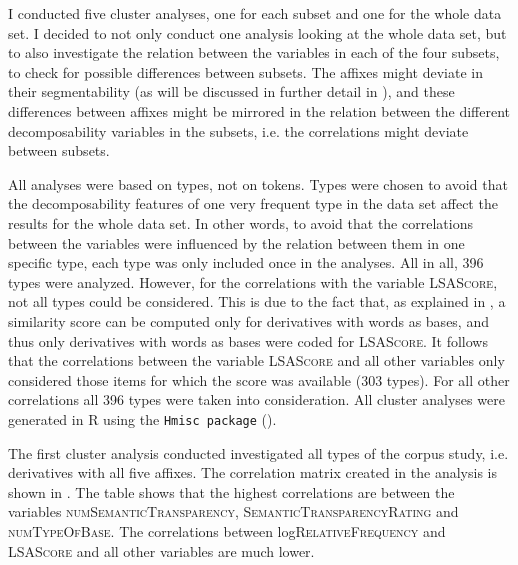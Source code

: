 I conducted five cluster analyses, one for each subset and one for the whole data set. 
I decided to not only conduct one analysis looking at the whole data set, but to also investigate the relation between the variables in each of the four subsets, to check for possible differences between subsets. The affixes might deviate in their segmentability (as will be discussed in further detail in ), and these differences between affixes might be mirrored in the relation between the different decomposability variables in the subsets, i.e. the correlations might deviate between subsets.

All analyses were based on types, not on tokens. Types were chosen to avoid that the decomposability features of one very frequent type in the data set affect the results for the whole data set. In other words, to avoid that the correlations between the variables were influenced by the relation between them in one specific type, each type was only included once in the analyses. 
All in all, 396 types were analyzed. However, for the correlations with the variable \textsc{LSAScore}, not all types could be considered. This is due to the fact that, as explained in , a similarity score can be computed only for derivatives with words as bases, and thus only derivatives with words as bases were coded for \textsc{LSAScore}. It follows that the correlations between the variable \textsc{LSAScore} and all other variables only considered those items for which the score was available (303 types). For all other correlations all 396 types were taken into consideration. 
All cluster analyses were generated in R using the \texttt{Hmisc package} (\citealt{Harrell.2017}).

The first cluster analysis conducted investigated all types of the corpus study, i.e. derivatives with all five affixes. The correlation matrix created in the analysis is shown in . The table shows that the highest correlations are between the variables \textsc{numSemanticTransparency}, \textsc{SemanticTransparencyRating} and \textsc{numTypeOfBase}. The correlations between log\textsc{RelativeFrequency} and \textsc{LSAScore} and all other variables are much lower. 



